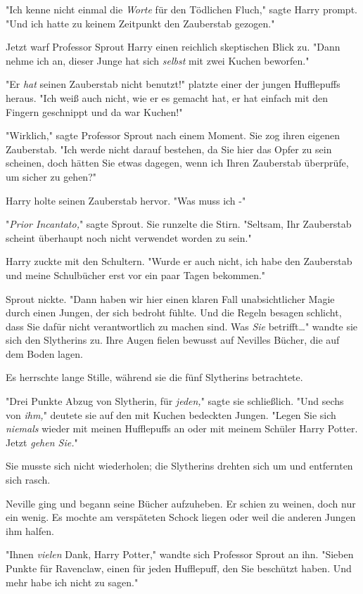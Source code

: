 {"Ich kenne nicht einmal die \emph{Worte} für den Tödlichen Fluch," sagte Harry prompt. "Und ich hatte zu keinem Zeitpunkt den Zauberstab gezogen."

Jetzt warf Professor Sprout Harry einen reichlich skeptischen Blick zu. "Dann nehme ich an, dieser Junge hat sich \emph{selbst} mit zwei Kuchen beworfen."

"Er \emph{hat} seinen Zauberstab nicht benutzt!" platzte einer der jungen Hufflepuffs heraus. "Ich weiß auch nicht, wie er es gemacht hat, er hat einfach mit den Fingern geschnippt und da war Kuchen!"

"Wirklich," sagte Professor Sprout nach einem Moment. Sie zog ihren eigenen Zauberstab. "Ich werde nicht darauf bestehen, da Sie hier das Opfer zu sein scheinen, doch hätten Sie etwas dagegen, wenn ich Ihren Zauberstab überprüfe, um sicher zu gehen?"

Harry holte seinen Zauberstab hervor. "Was muss ich -"

"\emph{Prior Incantato,}" sagte Sprout. Sie runzelte die Stirn. "Seltsam, Ihr Zauberstab scheint überhaupt noch nicht verwendet worden zu sein."

Harry zuckte mit den Schultern. "Wurde er auch nicht, ich habe den Zauberstab und meine Schulbücher erst vor ein paar Tagen bekommen."

Sprout nickte. "Dann haben wir hier einen klaren Fall unabsichtlicher Magie durch einen Jungen, der sich bedroht fühlte. Und die Regeln besagen schlicht, dass Sie dafür nicht verantwortlich zu machen sind. Was \emph{Sie} betrifft…" wandte sie sich den Slytherins zu. Ihre Augen fielen bewusst auf Nevilles Bücher, die auf dem Boden lagen.

Es herrschte lange Stille, während sie die fünf Slytherins betrachtete.

"Drei Punkte Abzug von Slytherin, für \emph{jeden,}" sagte sie schließlich. "Und sechs von \emph{ihm,}" deutete sie auf den mit Kuchen bedeckten Jungen. "Legen Sie sich \emph{niemals} wieder mit meinen Hufflepuffs an oder mit meinem Schüler Harry Potter. Jetzt \emph{gehen Sie.}"

Sie musste sich nicht wiederholen; die Slytherins drehten sich um und entfernten sich rasch.

Neville ging und begann seine Bücher aufzuheben. Er schien zu weinen, doch nur ein wenig. Es mochte am verspäteten Schock liegen oder weil die anderen Jungen ihm halfen.

"Ihnen \emph{vielen} Dank, Harry Potter," wandte sich Professor Sprout an ihn. "Sieben Punkte für Ravenclaw, einen für jeden Hufflepuff, den Sie beschützt haben. Und mehr habe ich nicht zu sagen."

}
